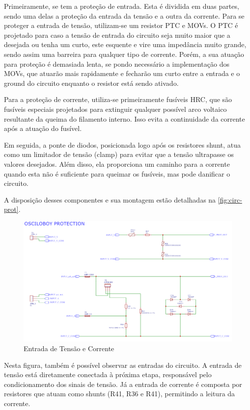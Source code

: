 Primeiramente, se tem a proteção de entrada. Esta é dividida em duas partes, sendo uma delas a proteção da entrada da tensão e a outra da corrente. Para se proteger a entrada de tensão, utilizam-se um resistor \gls{PTC} e \gls{MOV}s. O \gls{PTC} é projetado para caso a tensão de entrada do circuito seja muito maior que a desejada ou tenha um curto, este esquente e vire uma impedância muito grande, sendo assim uma barreira para qualquer tipo de corrente. Porém, a sua atuação para proteção é demasiada lenta, se pondo necessário a implementação dos \gls{MOV}s, que atuarão mais rapidamente e fecharão um curto entre a entrada e o ground do circuito enquanto o resistor está sendo ativado.

Para a proteção de corrente, utiliza-se primeiramente fusíveis \gls{HRC}, que são fusíveis especiais projetados para extinguir qualquer possível arco voltaico resultante da queima do filamento interno. Isso evita a continuidade da corrente após a atuação do fusível.

Em seguida, a ponte de diodos, posicionada logo após os resistores shunt, atua como um limitador de tensão (clamp) para evitar que a tensão ultrapasse os valores desejados. Além disso, ela proporciona um caminho para a corrente quando esta não é suficiente para queimar os fusíveis, mas pode danificar o circuito.

A disposição desses componentes e sua montagem estão detalhadas na \autoref{fig:circ-prot}.

\begin{figure}[htb!]
    \caption{Entrada de Tensão e Corrente}
    \label{fig:circ-prot}
    \includegraphics[width=1.0\textwidth]{figuras/circ-prot.png}
    \fonte{}
\end{figure}

Nesta figura, também é possível observar as entradas do circuito. A entrada de tensão está diretamente conectada à próxima etapa, responsável pelo condicionamento dos sinais de tensão. Já a entrada de corrente é composta por resistores que atuam como shunts (R41, R36 e R41), permitindo a leitura da corrente.

